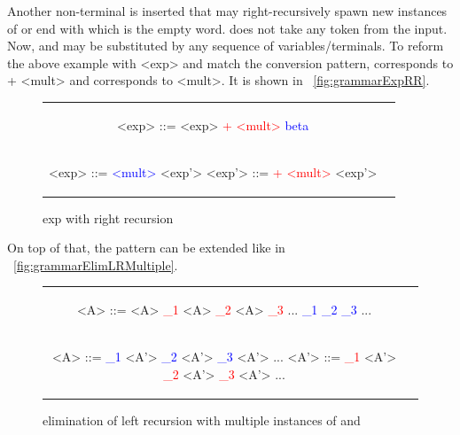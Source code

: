 Another non-terminal is inserted that may right-recursively spawn new instances of \alpha or end with \epsilon which is the empty word. \epsilon does not take any token from the input. Now, \alpha and \beta may be substituted by any sequence of variables/terminals. To reform the above example with <exp> and match the conversion pattern, \alpha corresponds to + <mult> and \beta corresponds to <mult>. It is shown in ~\ref{fig:grammarExpRR}.

\begin{figure}
	\label{grammarExpRR}
	\caption{exp with right recursion}

	\begin{center}
		\begin{tabular}{c c}
			\begin{grammar}
				<exp> ::= <exp> \textcolor{red}{+ <mult>}
				\alt \textcolor{blue}{beta}
			\end{grammar}
			\\
			\begin{grammar}
				<exp> ::= \textcolor{blue}{<mult>} <exp'>
				<exp'> ::= \textcolor{red}{+ <mult>} <exp'>
				\alt \epsilon
			\end{grammar}
		\end{tabular}
	\end{center}
\end{figure}

On top of that, the pattern can be extended like in ~\ref{fig:grammarElimLRMultiple}.

\begin{figure}
	\label{grammarElimLRMultiple}
	\caption{elimination of left recursion with multiple instances of \alpha and \beta}

	\begin{center}
		\begin{tabular}{c c}
			\begin{grammar}
				<A> ::= <A> \textcolor{red}{\alpha_1}
				\alt <A> \textcolor{red}{\alpha_2}
				\alt <A> \textcolor{red}{\alpha_3}
				...
				\alt \textcolor{blue}{\beta_1}
				\alt \textcolor{blue}{\beta_2}
				\alt \textcolor{blue}{\beta_3}
				...
			\end{grammar}
			\\
			\begin{grammar}
				<A> ::= \textcolor{blue}{\beta_1} <A'>
				\alt \textcolor{blue}{\beta_2} <A'>
				\alt \textcolor{blue}{\beta_3} <A'>
				...
				<A'> ::= \textcolor{red}{\alpha_1} <A'>
				\alt \textcolor{red}{\alpha_2} <A'>
				\alt \textcolor{red}{\alpha_3} <A'>
				...
				\alt \epsilon
			\end{grammar}
		\end{tabular}
	\end{center}
\end{figure}

